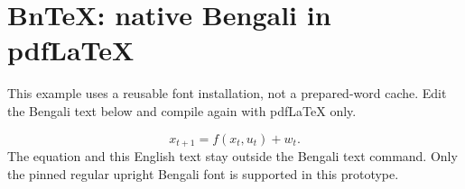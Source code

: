 \documentclass[12pt]{article}
\begin{document}
\section*{BnTeX: native Bengali in pdfLaTeX}
This example uses a reusable font installation, not a prepared-word cache.
Edit the Bengali text below and compile again with pdfLaTeX only.
\par\bigskip
{}
\par\medskip
{}
\par\medskip
{}
\par\medskip
{}
\[
x_{t+1}=f(x_t,u_t)+w_t.
\]
The equation and this English text stay outside the Bengali text command.
Only the pinned regular upright Bengali font is supported in this prototype.
\end{document}
